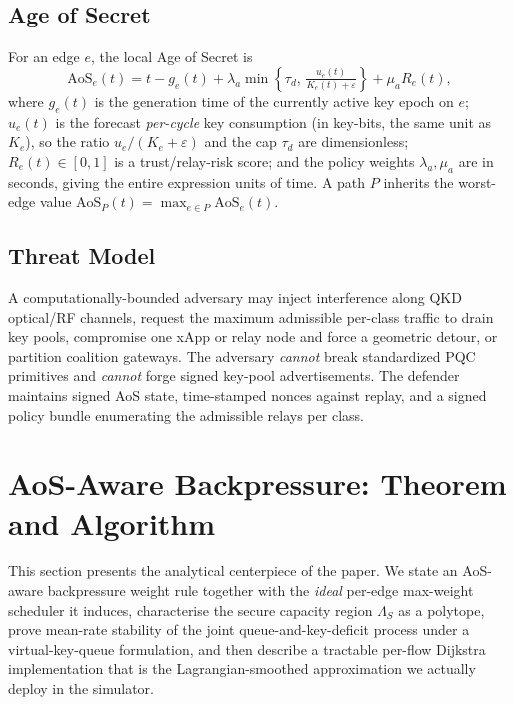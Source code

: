 \documentclass[conference]{IEEEtran}
\begin{document}
\subsection{Age of Secret}
For an edge $e$, the local Age of Secret is
\begin{equation}
\mathrm{AoS}_e(t) = t - g_e(t) + \lambda_a \min\!\left\{\tau_d,\,
                    \tfrac{u_e(t)}{K_e(t)+\varepsilon}\right\}
                  + \mu_a R_e(t),
\label{eq:aos}
\end{equation}
where $g_e(t)$ is the generation time of the currently active key
epoch on $e$; $u_e(t)$ is the forecast \emph{per-cycle} key
consumption (in key-bits, the same unit as $K_e$), so the ratio
$u_e/(K_e{+}\varepsilon)$ and the cap $\tau_d$ are dimensionless;
$R_e(t)\in[0,1]$ is a trust/relay-risk score; and the policy weights
$\lambda_a,\mu_a$ are in seconds, giving the entire expression units
of time.  A path $P$ inherits the worst-edge value
$\mathrm{AoS}_P(t) = \max_{e \in P} \mathrm{AoS}_e(t)$.

\subsection{Threat Model}
A computationally-bounded adversary may inject interference along QKD
optical/RF channels, request the maximum admissible per-class traffic
to drain key pools, compromise one xApp or relay node and force a
geometric detour, or partition coalition gateways.  The adversary
\emph{cannot} break standardized PQC primitives
\cite{nist_fips203_2024,nist_fips204_2024,nist_fips205_2024} and
\emph{cannot} forge signed key-pool advertisements.  The defender
maintains signed AoS state, time-stamped nonces against replay, and
a signed policy bundle enumerating the admissible relays per class.

\section{AoS-Aware Backpressure: Theorem and Algorithm}
\label{sec:algo}

This section presents the analytical centerpiece of the paper.  We
state an AoS-aware backpressure weight rule together with the
\emph{ideal} per-edge max-weight scheduler it induces, characterise
the secure capacity region $\Lambda_S$ as a polytope, prove
mean-rate stability of the joint queue-and-key-deficit process under
a virtual-key-queue formulation, and then describe a tractable
per-flow Dijkstra implementation that is the Lagrangian-smoothed
approximation we actually deploy in the simulator.
\end{document}
